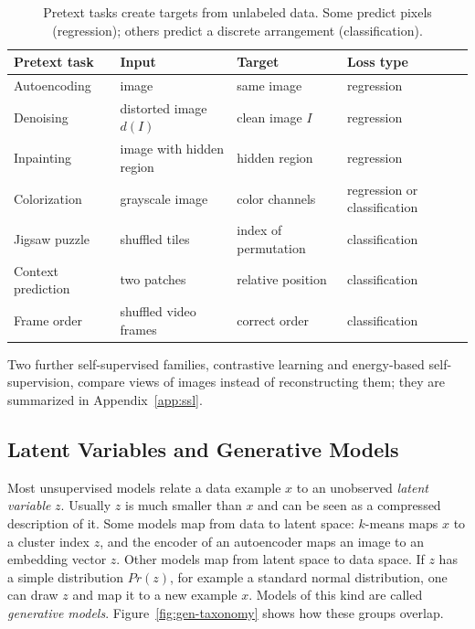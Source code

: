 \begin{table}[ht]
  \centering
  \begin{tabular}{@{}p{3.3cm}p{4.0cm}p{3.8cm}p{2.9cm}@{}}
    \toprule
    Pretext task & Input & Target & Loss type \\
    \midrule
    Autoencoding & image & same image & regression \\
    Denoising & distorted image $d(I)$ & clean image $I$ & regression \\
    Inpainting & image with hidden region & hidden region & regression \\
    Colorization & grayscale image & color channels & regression or
      classification \\
    Jigsaw puzzle & shuffled tiles & index of permutation & classification \\
    Context prediction & two patches & relative position & classification \\
    Frame order & shuffled video frames & correct order & classification \\
    \bottomrule
  \end{tabular}
  \caption{Pretext tasks create targets from unlabeled data. Some predict
  pixels (regression); others predict a discrete arrangement
  (classification).}
  \label{tab:pretext}
\end{table}

\noindent
Two further self-supervised families, contrastive learning and energy-based
self-supervision, compare views of images instead of reconstructing them; they
are summarized in Appendix~\ref{app:ssl}.

\subsection{Latent Variables and Generative Models}

Most unsupervised models relate a data example $x$ to an unobserved
\emph{latent variable} $z$. Usually $z$ is much smaller than $x$ and can be
seen as a compressed description of it. Some models map from data to latent
space: $k$-means maps $x$ to a cluster index $z$, and the encoder of an
autoencoder maps an image to an embedding vector $z$. Other models map from
latent space to data space. If $z$ has a simple distribution $Pr(z)$, for
example a standard normal distribution, one can draw $z$ and map it to a new
example $x$. Models of this kind are called \emph{generative models}.
Figure~\ref{fig:gen-taxonomy} shows how these groups overlap.


